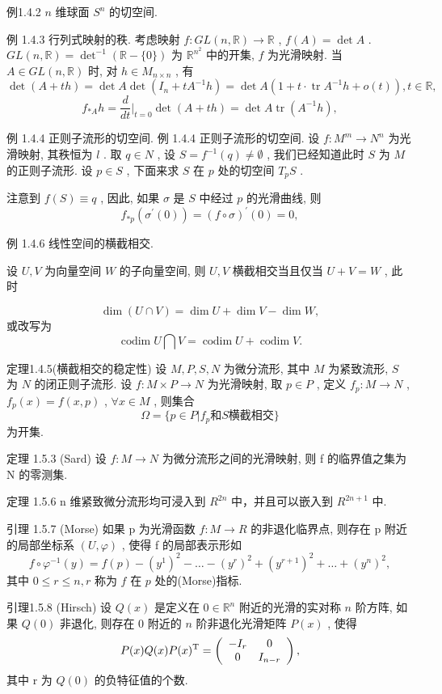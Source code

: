 \documentclass[]{article}
\begin{document}
例1.4.2 $n$ 维球面 $S^n$ 的切空间. 

例 1.4.3 行列式映射的秩. 考虑映射 $f: GL(n, \mathbb{R}) \to \mathbb{R}$ , $f(A) = \det A$ . $GL(n, \mathbb{R}) = \det^{-1}(\mathbb{R} - \{0\})$ 为 $\mathbb{R}^{n^2}$ 中的开集, $f$ 为光滑映射. 当 $A \in GL(n, \mathbb{R})$ 时, 对 $h \in M_{n \times n}$ , 有 $$
\det (A + t h) = \det A \det (I _ {n} + t A ^ {- 1} h) = \det A (1 + t \cdot \operatorname{tr} A ^ {- 1} h + o (t)), t \in \mathbb {R},
$$
$$
f _ {* A} h = \frac {d}{d t} \big | _ {t = 0} \det (A + t h) = \det A \operatorname{tr} (A ^ {- 1} h),
$$

例 1.4.4 正则子流形的切空间. 例 1.4.4 正则子流形的切空间. 设 $f: M^m \to N^n$ 为光滑映射, 其秩恒为 $l$ . 取 $q \in N$ , 设 $S = f^{-1}(q) \neq \emptyset$ , 我们已经知道此时 $S$ 为 $M$ 的正则子流形. 设 $p \in S$ , 下面来求 $S$ 在 $p$ 处的切空间 $T_pS$ . 

注意到 $f(S) \equiv q$ , 因此, 如果 $\sigma$ 是 $S$ 中经过 $p$ 的光滑曲线, 则 $$
f _ {* p} (\sigma^ {\prime} (0)) = (f \circ \sigma) ^ {\prime} (0) = 0,
$$



例 1.4.6 线性空间的横截相交. 

设 $U, V$ 为向量空间 $W$ 的子向量空间, 则 $U, V$ 横截相交当且仅当 $U + V = W$ , 此时 

$$
\dim (U \cap V) = \dim U + \dim V - \dim W,
$$或改写为
 $$
\operatorname{codim} U \bigcap V = \operatorname{codim} U + \operatorname{codim} V.
$$

定理1.4.5(横截相交的稳定性) 设 $M, P, S, N$ 为微分流形, 其中 $M$ 为紧致流形, $S$ 为 $N$ 的闭正则子流形. 设 $f: M \times P \to N$ 为光滑映射, 取 $p \in P$ , 定义 $f_p: M \to N$ , $f_p(x) = f(x, p)$ , $\forall x \in M$ , 则集合 $$
\varOmega = \{p \in P   |   f _ {p}   \text {和}   S   \text {横截相交} \}
$$为开集. 

定理 1.5.3 (Sard) 设 $f: M \rightarrow N$ 为微分流形之间的光滑映射, 则 f 的临界值之集为 N 的零测集. 

定理 1.5.6 n 维紧致微分流形均可浸入到 $R^{2n}$ 中，并且可以嵌入到 $R^{2n+1}$ 中. 

引理 1.5.7 (Morse) 如果 p 为光滑函数 $f: M \rightarrow R$ 的非退化临界点, 则存在 p 附近的局部坐标系 $(U, \varphi)$ , 使得 f 的局部表示形如 $$
f \circ \varphi^ {- 1} (y) = f (p) - (y ^ {1}) ^ {2} - \dots - (y ^ {r}) ^ {2} + (y ^ {r + 1}) ^ {2} + \dots + (y ^ {n}) ^ {2},
$$其中 $0 \leqslant r \leqslant n, r$ 称为 $f$ 在 $p$ 处的(Morse)指标. 

引理1.5.8 (Hirsch) 设 $Q(x)$ 是定义在 $0 \in \mathbb{R}^n$ 附近的光滑的实对称 $n$ 阶方阵, 如果 $Q(0)$ 非退化, 则存在 0 附近的 $n$ 阶非退化光滑矩阵 $P(x)$ , 使得 $$
P (x) Q (x) P (x) ^ {\mathrm{T}} = \left( \begin{array}{c c} - I _ {r} & 0 \\ 0 & I _ {n - r} \end{array} \right),
$$其中 r 为 $Q(0)$ 的负特征值的个数. 
\end{document}
